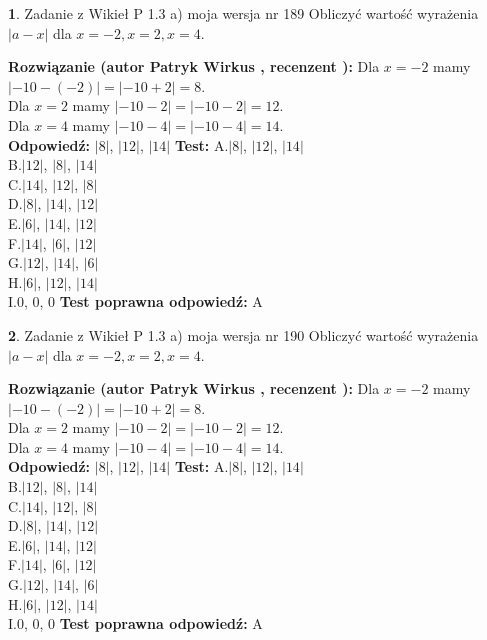 \documentclass[12pt, a4paper]{article}
\theoremstyle{definition} %
\newtheorem{zad}{}
\newcommand{\zadStart}[1]{\begin{zad}#1\newline}
\newcommand{\zadStop}{\end{zad}}
\newcommand{\rozwStart}[2]{\noindent \textbf{Rozwiązanie (autor #1 , recenzent #2): }\newline}
\newcommand{\rozwStop}{\newline}
\newcommand{\odpStart}{\noindent \textbf{Odpowiedź:}\newline}
\newcommand{\odpStop}{\newline}
\newcommand{\testStart}{\noindent \textbf{Test:}\newline}
\newcommand{\testStop}{\newline}
\newcommand{\kluczStart}{\noindent \textbf{Test poprawna odpowiedź:}\newline}
\newcommand{\kluczStop}{\newline}
\begin{document}
\zadStart{Zadanie z Wikieł P 1.3 a) moja wersja nr 189}
Obliczyć wartość wyrażenia $|a - x|$ dla $x=-2,x=2,x=4$.
\zadStop
\rozwStart{Patryk Wirkus}{}
Dla $x = -2$ mamy $|-10 - (-2)| = |-10 + 2| = 8$.\\
Dla $x = 2$ mamy $|-10 - 2| = |-10 - 2| = 12$.\\
Dla $x = 4$ mamy $|-10 - 4| = |-10 - 4| = 14$.\\
\rozwStop
\odpStart
$|8|$, $|12|$, $|14|$
\odpStop
\testStart
A.$|8|$, $|12|$, $|14|$\\
B.$|12|$, $|8|$, $|14|$\\
C.$|14|$, $|12|$, $|8|$\\
D.$|8|$, $|14|$, $|12|$\\
E.$|6|$, $|14|$, $|12|$\\
F.$|14|$, $|6|$, $|12|$\\
G.$|12|$, $|14|$, $|6|$\\
H.$|6|$, $|12|$, $|14|$\\
I.$0$, $0$, $0$
\testStop
\kluczStart
A
\kluczStop



\zadStart{Zadanie z Wikieł P 1.3 a) moja wersja nr 190}
Obliczyć wartość wyrażenia $|a - x|$ dla $x=-2,x=2,x=4$.
\zadStop
\rozwStart{Patryk Wirkus}{}
Dla $x = -2$ mamy $|-10 - (-2)| = |-10 + 2| = 8$.\\
Dla $x = 2$ mamy $|-10 - 2| = |-10 - 2| = 12$.\\
Dla $x = 4$ mamy $|-10 - 4| = |-10 - 4| = 14$.\\
\rozwStop
\odpStart
$|8|$, $|12|$, $|14|$
\odpStop
\testStart
A.$|8|$, $|12|$, $|14|$\\
B.$|12|$, $|8|$, $|14|$\\
C.$|14|$, $|12|$, $|8|$\\
D.$|8|$, $|14|$, $|12|$\\
E.$|6|$, $|14|$, $|12|$\\
F.$|14|$, $|6|$, $|12|$\\
G.$|12|$, $|14|$, $|6|$\\
H.$|6|$, $|12|$, $|14|$\\
I.$0$, $0$, $0$
\testStop
\kluczStart
A
\kluczStop
\end{document}
